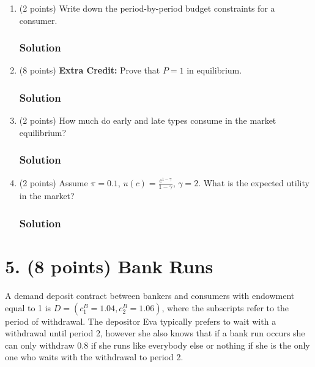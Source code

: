 \documentclass[12pt]{article}
\begin{document}
\begin{enumerate}[label=(\alph*)]
    \item (2 points) Write down the period-by-period budget constraints for a consumer.
    \subsubsection*{Solution}

    \item (8 points) \textbf{Extra Credit:} Prove that $P = 1$ in equilibrium.
    \subsubsection*{Solution}

    
    \item (2 points) How much do early and late types consume in the market equilibrium?
    \subsubsection*{Solution}

    
    \item (2 points) Assume $\pi = 0.1$, $u(c) = \frac{c^{1-\gamma}}{1- \gamma}$, $\gamma = 2$. What is the expected utility in the market?
    \subsubsection*{Solution}


    
\end{enumerate}

\section*{5. (8 points) Bank Runs}

A demand deposit contract between bankers and consumers with endowment equal to 1 is $D = (c^B_1 = 1.04, c^B_2 = 1.06)$, where the subscripts refer to the period of withdrawal. The depositor Eva typically prefers to wait with a withdrawal until period 2, however she also knows that if a bank run occurs she can only withdraw 0.8 if she runs like everybody else or nothing if she is the only one who waits with the withdrawal to period 2.
\end{document}
